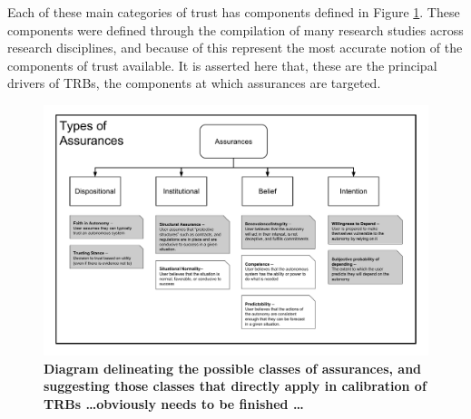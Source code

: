         Each of these main categories of trust has components defined in Figure \ref{fig:Assurance_classes}. These components were defined through the compilation of many research studies across research disciplines, and because of this represent the most accurate notion of the components of trust available. It is asserted here that, these are the principal drivers of TRBs, the components at which assurances are targeted.

        \begin{figure}
            \includegraphics[width=8in]{Figures/Assurances.pdf}%
            \caption{\textbf{Diagram delineating the possible classes of assurances, and suggesting those classes that directly apply in calibration of TRBs \ldots obviously needs to be finished \ldots}}
            \label{fig:Assurance_classes}
        \end{figure}
